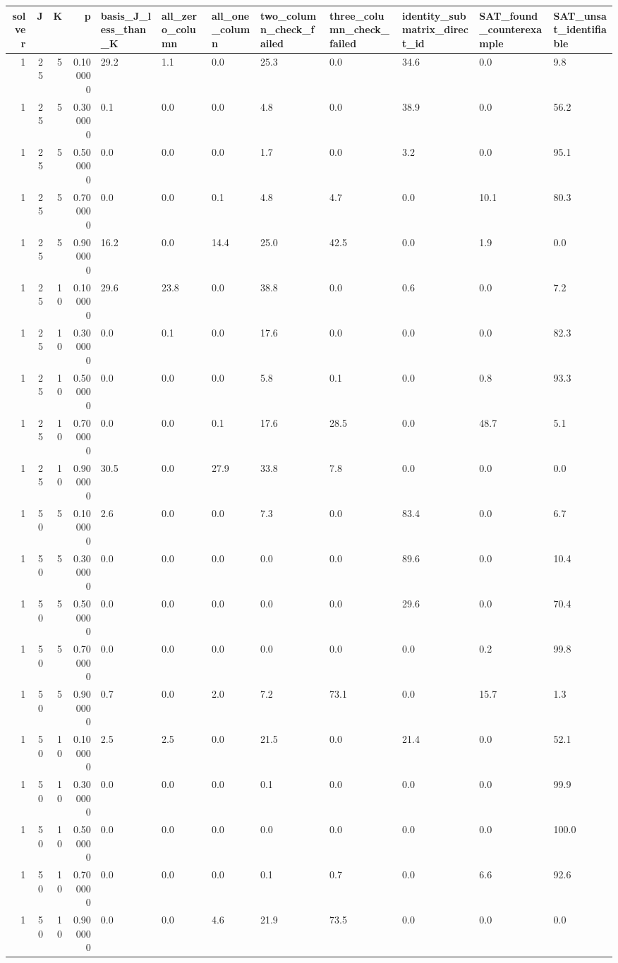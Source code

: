 \begin{tabular}{rrrrllllllll}
\toprule
solver & J & K & p & basis_J_less_than_K & all_zero_column & all_one_column & two_column_check_failed & three_column_check_failed & identity_submatrix_direct_id & SAT_found_counterexample & SAT_unsat_identifiable \\
\midrule
1 & 25 & 5 & 0.100000 & 29.2 & 1.1 & 0.0 & 25.3 & 0.0 & 34.6 & 0.0 & 9.8 \\
1 & 25 & 5 & 0.300000 & 0.1 & 0.0 & 0.0 & 4.8 & 0.0 & 38.9 & 0.0 & 56.2 \\
1 & 25 & 5 & 0.500000 & 0.0 & 0.0 & 0.0 & 1.7 & 0.0 & 3.2 & 0.0 & 95.1 \\
1 & 25 & 5 & 0.700000 & 0.0 & 0.0 & 0.1 & 4.8 & 4.7 & 0.0 & 10.1 & 80.3 \\
1 & 25 & 5 & 0.900000 & 16.2 & 0.0 & 14.4 & 25.0 & 42.5 & 0.0 & 1.9 & 0.0 \\
1 & 25 & 10 & 0.100000 & 29.6 & 23.8 & 0.0 & 38.8 & 0.0 & 0.6 & 0.0 & 7.2 \\
1 & 25 & 10 & 0.300000 & 0.0 & 0.1 & 0.0 & 17.6 & 0.0 & 0.0 & 0.0 & 82.3 \\
1 & 25 & 10 & 0.500000 & 0.0 & 0.0 & 0.0 & 5.8 & 0.1 & 0.0 & 0.8 & 93.3 \\
1 & 25 & 10 & 0.700000 & 0.0 & 0.0 & 0.1 & 17.6 & 28.5 & 0.0 & 48.7 & 5.1 \\
1 & 25 & 10 & 0.900000 & 30.5 & 0.0 & 27.9 & 33.8 & 7.8 & 0.0 & 0.0 & 0.0 \\
1 & 50 & 5 & 0.100000 & 2.6 & 0.0 & 0.0 & 7.3 & 0.0 & 83.4 & 0.0 & 6.7 \\
1 & 50 & 5 & 0.300000 & 0.0 & 0.0 & 0.0 & 0.0 & 0.0 & 89.6 & 0.0 & 10.4 \\
1 & 50 & 5 & 0.500000 & 0.0 & 0.0 & 0.0 & 0.0 & 0.0 & 29.6 & 0.0 & 70.4 \\
1 & 50 & 5 & 0.700000 & 0.0 & 0.0 & 0.0 & 0.0 & 0.0 & 0.0 & 0.2 & 99.8 \\
1 & 50 & 5 & 0.900000 & 0.7 & 0.0 & 2.0 & 7.2 & 73.1 & 0.0 & 15.7 & 1.3 \\
1 & 50 & 10 & 0.100000 & 2.5 & 2.5 & 0.0 & 21.5 & 0.0 & 21.4 & 0.0 & 52.1 \\
1 & 50 & 10 & 0.300000 & 0.0 & 0.0 & 0.0 & 0.1 & 0.0 & 0.0 & 0.0 & 99.9 \\
1 & 50 & 10 & 0.500000 & 0.0 & 0.0 & 0.0 & 0.0 & 0.0 & 0.0 & 0.0 & 100.0 \\
1 & 50 & 10 & 0.700000 & 0.0 & 0.0 & 0.0 & 0.1 & 0.7 & 0.0 & 6.6 & 92.6 \\
1 & 50 & 10 & 0.900000 & 0.0 & 0.0 & 4.6 & 21.9 & 73.5 & 0.0 & 0.0 & 0.0 \\

\end{tabular}
